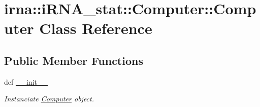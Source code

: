 \hypertarget{classirna_1_1iRNA__stat_1_1Computer_1_1Computer}{
\section{irna\-:\-:i\-R\-N\-A\-\_\-stat\-:\-:\-Computer\-:\-:\-Computer \-Class \-Reference}
\label{classirna_1_1iRNA__stat_1_1Computer_1_1Computer}
}
\subsection*{\-Public \-Member \-Functions}
\begin{DoxyCompactItemize}
\item 
def \hyperlink{classirna_1_1iRNA__stat_1_1Computer_1_1Computer_a151bbf565fa668d8e2fb29eff7e6cf56}{\-\_\-\-\_\-init\-\_\-\-\_\-}
\begin{DoxyCompactList}\small\item\em \-Instanciate \hyperlink{classirna_1_1iRNA__stat_1_1Computer_1_1Computer}{\-Computer} object. \end{DoxyCompactList}\end{DoxyCompactItemize}
